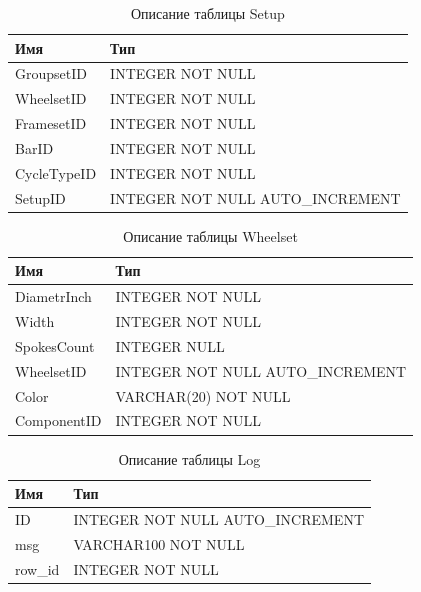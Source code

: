 
\begin{table}[h!] 
	\centering
	\caption{Описание таблицы Setup}
	\begin{tabular}{|l|l|}
		\hline \textbf{Имя} & \textbf{Тип} \\
		\hline
		GroupsetID &    INTEGER NOT NULL \\ \hline
		WheelsetID &    INTEGER NOT NULL \\ \hline
		FramesetID &    INTEGER NOT NULL \\ \hline
		BarID & INTEGER NOT NULL \\ \hline
		CycleTypeID &   INTEGER NOT NULL \\ \hline
		SetupID &       INTEGER NOT NULL AUTO\_INCREMENT \\ \hline
	\end{tabular}
	\label{tab:setup}
\end{table}



\begin{table}[h!] 
	\centering
	\caption{Описание таблицы Wheelset}
	\begin{tabular}{|l|l|}
		\hline \textbf{Имя} & \textbf{Тип} \\
		\hline
		DiametrInch &   INTEGER NOT NULL \\ \hline
		Width & INTEGER NOT NULL \\ \hline
		SpokesCount &   INTEGER NULL \\ \hline
		WheelsetID &    INTEGER NOT NULL AUTO\_INCREMENT \\ \hline
		Color & VARCHAR(20) NOT NULL \\ \hline
		ComponentID &   INTEGER NOT NULL \\ \hline
	\end{tabular}
	\label{tab:wheelset}
\end{table}

\begin{table}[h!] 
	\centering
	\caption{Описание таблицы Log}
	\begin{tabular}{|l|l|}
		\hline \textbf{Имя} & \textbf{Тип} \\
		\hline
		ID &   INTEGER NOT NULL AUTO\_INCREMENT \\ \hline
		msg & VARCHAR{100} NOT NULL \\ \hline
		row\_id & INTEGER NOT NULL \\ \hline
	\end{tabular}
	\label{tab:log}
\end{table}



